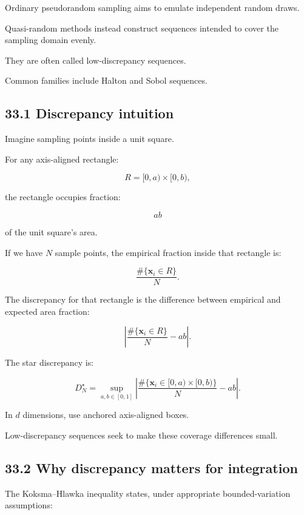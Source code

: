 Ordinary pseudorandom sampling aims to emulate independent random draws.

Quasi-random methods instead construct sequences intended to cover the sampling domain evenly.

They are often called low-discrepancy sequences.

Common families include Halton and Sobol sequences.

\subsection{33.1 Discrepancy intuition}\label{02-foundations-ii-ch031-discrepancy-intuition}

\hypertarget{02-foundations-ii-ch031-discrepancy-intuition}{}

Imagine sampling points inside a unit square.

For any axis-aligned rectangle:

\[ R=[0,a)\times[0,b), \]

the rectangle occupies fraction:

\[ ab \]

of the unit square's area.

If we have \(N\) sample points, the empirical fraction inside that rectangle is:

\[ \frac{\#\{\mathbf x_i\in R\}}{N}. \]

The discrepancy for that rectangle is the difference between empirical and expected area fraction:

\[ \left| \frac{\#\{\mathbf x_i\in R\}}{N}-ab \right|. \]

The star discrepancy is:

\[ \boxed{ D_N^\star= \sup_{a,b\in[0,1]} \left| \frac{\#\{\mathbf x_i\in[0,a)\times[0,b)\}}N-ab \right| }. \]

In \(d\) dimensions, use anchored axis-aligned boxes.

Low-discrepancy sequences seek to make these coverage differences small.

\subsection{33.2 Why discrepancy matters for integration}\label{02-foundations-ii-ch031-why-discrepancy-matters-for-integration}

\hypertarget{02-foundations-ii-ch031-why-discrepancy-matters-for-integration}{}

The Koksma--Hlawka inequality states, under appropriate bounded-variation assumptions:

